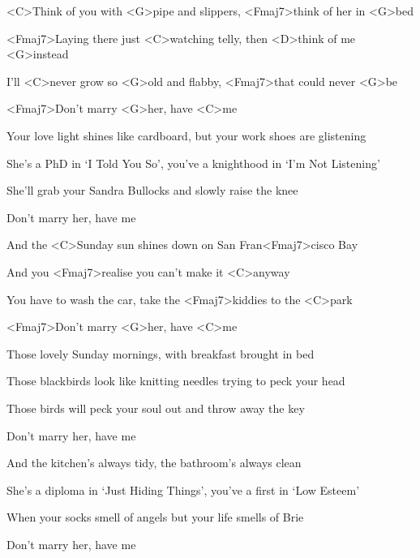 
\zs

<C>Think of you with <G>pipe and slippers, <Fmaj7>think of her in <G>bed

<Fmaj7>Laying there just <C>watching telly, then <D>think of me <G>instead

I'll <C>never grow so <G>old and flabby, <Fmaj7>that could never <G>be

<Fmaj7>Don't marry <G>her, have <C>me
\ks

\zs
Your love light shines like cardboard, but your work shoes are glistening

She's a PhD in `I Told You So', you've a knighthood in `I'm Not Listening'

She'll grab your Sandra Bullocks and slowly raise the knee

Don't marry her, have me
\ks

\zr

And the <C>Sunday sun shines down on San Fran<Fmaj7>cisco Bay

And you <Fmaj7>realise you can't make it <C>anyway

You have to wash the car, take the <Fmaj7>kiddies to the <C>park

<Fmaj7>Don't marry <G>her, have <C>me
\kr

\zs
Those lovely Sunday mornings, with breakfast brought in bed

Those blackbirds look like knitting needles trying to peck your head

Those birds will peck your soul out and throw away the key

Don't marry her, have me
\ks

\zs
And the kitchen's always tidy, the bathroom's always clean

She's a diploma in `Just Hiding Things', you've a first in `Low Esteem'

When your socks smell of angels but your life smells of Brie

Don't marry her, have me
\ks

\zr
\kr

\zr
\kr

\kp
